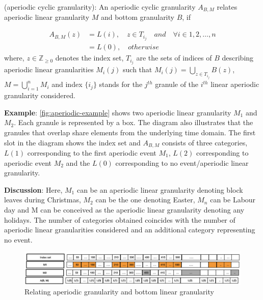 \documentclass[12pt]{article}
\begin{document}
\begin{definition}\label{aperiodic}
(aperiodic cyclic granularity): An aperiodic cyclic granularity $A_{B, M}$ relates aperiodic linear granularity $M$ and bottom granularity $B$, if

\begin{equation}\label{eq:aperiodic}
\begin{split}
A_{B, M}(z) & = L(i), \quad z \in T_{i_j} \quad and \quad \forall i \in {1, 2, \dots, n}\\
     & = L(0), \quad otherwise
\end{split}     
\end{equation}
where, 
$z \in \mathbb{Z}_{\geq 0}$ denotes the index set,
$T_{i_j}$ are the sets of indices of $B$ describing aperiodic linear granularities $M_{i}(j)$ such that $M_{i}(j) = \bigcup_{z \in T_{i_j}}B(z)$, $M = \bigcup_{i=1}^{n}M_{i}$ and index ${\{i_j\}}$ stands for the $j^{th}$ granule of the $i^{th}$ linear aperiodic granularity considered.
\end{definition}

\textbf{Example}: \autoref{fig:aperiodic-example} shows two aperiodic linear granularity \(M_1\) and \(M_2\). Each granule is represented by a box. The diagram also illustrates that the granules that overlap share elements from the underlying time domain. The first slot in the diagram shows the index set and \(A_{B, M}\) consists of three categories, \(L(1)\) corresponding to the first aperiodic event \(M_1\), \(L(2)\) corresponding to aperiodic event \(M_2\) and the \(L(0)\) corresponding to no event/aperiodic linear granularity.

\textbf{Discussion}: Here, \(M_1\) can be an aperiodic linear granularity denoting block leaves during Christmas, \(M_2\) can be the one denoting Easter, \(M_n\) can be Labour day and M can be conceived as the aperiodic linear granularity denoting any holidays. The number of categories obtained coincides with the number of aperiodic linear granularities considered and an additional category representing no event.

\begin{figure}

{\centering \includegraphics[width=1\linewidth]{Figs/aperiodic-example} 

}

\caption{Relating aperiodic granularity and bottom linear granularity }\label{fig:aperiodic-example}
\end{figure}
\end{document}
